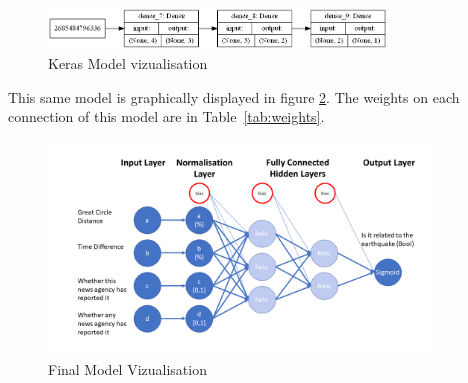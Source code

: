 \begin{figure}[H]
\caption{Keras Model vizualisation}  \label{fig:modelviz} 
\centering
\includegraphics[width=0.8\textwidth]{Figures/model.png}
\end{figure}

This same model is graphically displayed in figure \ref{fig:fullmodel}. The weights on each connection of this model are in Table~\ref{tab:weights}.

\begin{figure}
\caption{Final Model Vizualisation}  \label{fig:fullmodel} 
\centering
\includegraphics[width=0.9\textwidth]{Figures/FinalNetwork.png}
\end{figure}

